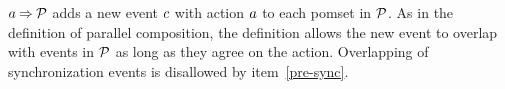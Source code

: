 \begin{definition}
\begin{enumerate}
\end{enumerate}
\end{definition}




$a\mathbin\Rightarrow\mathcal{P}$ adds a new event $c$ with action $a$ to each
pomset in $\mathcal{P}$.  As in the definition of parallel composition, the
definition allows the new event to overlap with events in $\mathcal{P}$ as long as
they agree on the action.  Overlapping of synchronization events is
disallowed by item~\ref{pre-sync}.

